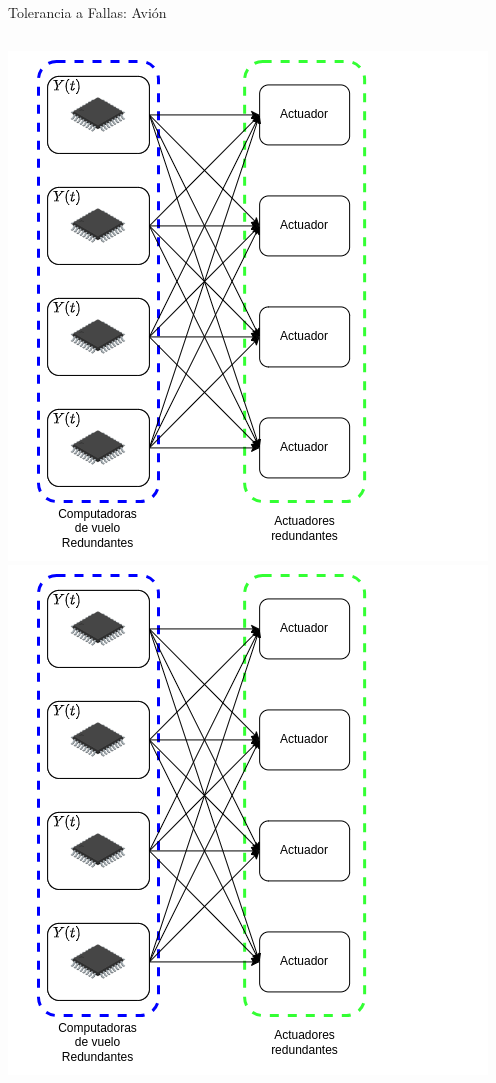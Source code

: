 \begin{frame}{Tolerancia a Fallas: Avión}
\begin{columns}
\begin{overprint}
				\includegraphics[width=\textwidth]{img/calculo_actuacion_2.png}
				\onslide<5>\includegraphics[width=\textwidth]{img/calculo_actuacion_2.png}
			\end{overprint}
	\end{columns}
\end{frame}

